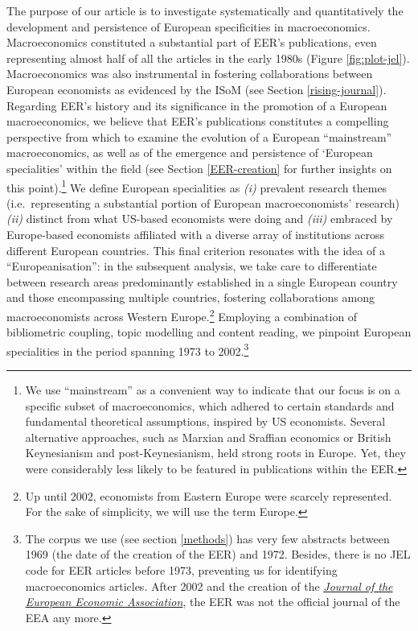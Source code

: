 \documentclass[
  12pt,
  onecolumn]{article}
\begin{document}
The purpose of our article is to investigate systematically and
quantitatively the development and persistence of European specificities
in macroeconomics. Macroeconomics constituted a substantial part of
EER's publications, even representing almost half of all the articles in
the early 1980s (Figure \ref{fig:plot-jel}). Macroeconomics was also
instrumental in fostering collaborations between European economists as
evidenced by the ISoM (see Section \ref{rising-journal}). Regarding
EER's history and its significance in the promotion of a European
macroeconomics, we believe that EER's publications constitutes a
compelling perspective from which to examine the evolution of a European
``mainstream'' macroeconomics, as well as of the emergence and
persistence of `European specialities' within the field (see Section
\ref{EER-creation} for further insights on this point).\footnote{We use
  ``mainstream'' as a convenient way to indicate that our focus is on a
  specific subset of macroeconomics, which adhered to certain standards
  and fundamental theoretical assumptions, inspired by US economists.
  Several alternative approaches, such as Marxian and Sraffian economics
  or British Keynesianism and post-Keynesianism, held strong roots in
  Europe. Yet, they were considerably less likely to be featured in
  publications within the EER.} We define European specialities as
\emph{(i)} prevalent research themes (i.e.~representing a substantial
portion of European macroeconomists' research) \emph{(ii)} distinct from
what US-based economists were doing and \emph{(iii)} embraced by
Europe-based economists affiliated with a diverse array of institutions
across different European countries. This final criterion resonates with
the idea of a ``Europeanisation'': in the subsequent analysis, we take
care to differentiate between research areas predominantly established
in a single European country and those encompassing multiple countries,
fostering collaborations among macroeconomists across Western
Europe.\footnote{Up until 2002, economists from Eastern Europe were
  scarcely represented. For the sake of simplicity, we will use the term
  Europe.} Employing a combination of bibliometric coupling, topic
modelling and content reading, we pinpoint European specialities in the
period spanning 1973 to 2002.\footnote{The corpus we use (see section
  \ref{methods}) has very few abstracts between 1969 (the date of the
  creation of the EER) and 1972. Besides, there is no JEL code for EER
  articles before 1973, preventing us for identifying macroeconomics
  articles. After 2002 and the creation of the
  \href{https://academic.oup.com/jeea}{\emph{Journal of the European
  Economic Association}}, the EER was not the official journal of the
  EEA any more.}
\end{document}
